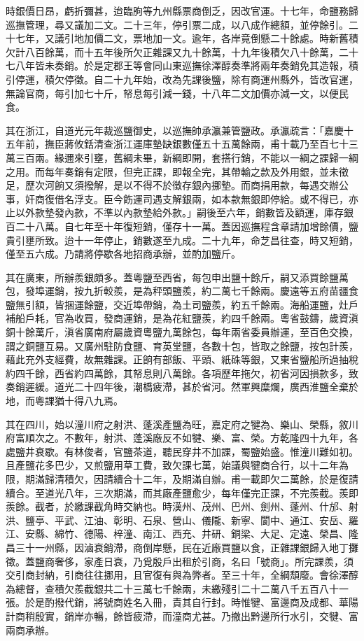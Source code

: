 \begin{pinyinscope}
時銀價日昂，虧折彌甚，迨臨朐等九州縣票商倒乏，因改官運。十七年，命鹽務歸巡撫管理，尋又議加二文。二十三年，停引票二成，以八成作總額，並停餘引。二十七年，又議引地加價二文，票地加一文。逾年，各岸竟倒懸二十餘處。時新舊積欠計八百餘萬，而十五年後所欠正雜課又九十餘萬，十九年後積欠八十餘萬，二十七八年皆未奏銷。於是定郡王等會同山東巡撫徐澤醇奏準將兩年奏銷免其造報，積引停運，積欠停徵。自二十九年始，改為先課後鹽，除有商運州縣外，皆改官運，無論官商，每引加七十斤，帑息每引減一錢，十八年二文加價亦減一文，以便民食。

其在浙江，自道光元年裁巡鹽御史，以巡撫帥承瀛兼管鹽政。承瀛疏言：「嘉慶十五年前，撫臣蔣攸銛清查浙江運庫墊缺銀數僅五十五萬餘兩，甫十載乃至百七十三萬三百兩。緣邇來引壅，舊綱未畢，新綱即開，套搭行銷，不能以一綱之課歸一綱之用。而每年奏銷有定限，但完正課，即報全完，其帶輸之款及外用銀，並未徵足，歷次河餉又須撥解，是以不得不於徵存銀內挪墊。而商捐用款，每遇交辦公事，奸商復借名浮支。臣今飭運司遇支解銀兩，如本款無銀即停給。或不得已，亦止以外款墊發內款，不準以內款墊給外款。」嗣後至六年，銷數皆及額運，庫存銀百二十八萬。自七年至十年復短銷，僅存十一萬。蓋因巡撫程含章請加增餘價，鹽貴引壅所致。迨十一年停止，銷數遂至九成。二十九年，命芝昌往查，時又短銷，僅至五六成。乃請將停歇各地招商承辦，並酌加鹽斤。

其在廣東，所辦羨銀頗多。蓋粵鹽至西省，每包申出鹽十餘斤，嗣又添買餘鹽萬包，發埠運銷，按九折較羨，是為秤頭鹽羨，約二萬七千餘兩。慶遠等五府苗疆食鹽無引額，皆捆運餘鹽，交近埠帶銷，為土司鹽羨，約五千餘兩。海船運鹽，灶戶補船戶耗，官為收買，發商運銷，是為花紅鹽羨，約四千餘兩。粵省鼓鑄，歲資滇銅十餘萬斤，滇省廣南府屬歲資粵鹽九萬餘包，每年兩省委員辦運，至百色交換，謂之銅鹽互易。又廣州駐防食鹽、育英堂鹽，各數十包，皆取之餘鹽，按包計羨，藉此充外支經費，故無雜課。正餉有部飯、平頭、紙硃等銀，又東省鹽船所過抽稅約四千餘，西省約四萬餘，其帑息則八萬餘。各項歷年拖欠，初省河因損款多，致奏銷遲緩。道光二十四年後，潮橋疲滯，甚於省河。然軍興糜爛，廣西淮鹽全棄於地，而粵課猶十得八九焉。

其在四川，始以潼川府之射洪、蓬溪產鹽為旺，嘉定府之犍為、樂山、榮縣，敘川府富順次之。不數年，射洪、蓬溪廠反不如犍、樂、富、榮。方乾隆四十九年，各處鹽井衰歇。有林俊者，官鹽茶道，聽民穿井不加課，蜀鹽始盛。惟潼川難如初。且產鹽花多巴少，又煎鹽用草工費，致欠課七萬，始議與犍商合行，以十二年為限，期滿歸清積欠，因請續合十二年，及期滿自辦。甫一載即欠二萬餘，於是復請續合。至道光八年，三次期滿，而其廠產鹽愈少，每年僅完正課，不完羨截。羨即羨餘。截者，於繳課截角時交納也。時漢州、茂州、巴州、劍州、蓬州、什邡、射洪、鹽亭、平武、江油、彰明、石泉、營山、儀隴、新寧、閬中、通江、安岳、羅江、安縣、綿竹、德陽、梓潼、南江、西充、井研、銅梁、大足、定遠、榮昌、隆昌三十一州縣，因滷衰銷滯，商倒岸懸，民在近廠買鹽以食，正雜課銀歸入地丁攤徵。蓋鹽商奢侈，家產日衰，乃覓殷戶出租於引商，名曰「號商」。所完課羨，須交引商封納，引商往往挪用，且官復有與為弊者。至三十年，全綱頹廢。會徐澤醇為總督，查積欠羨截銀共二十三萬七千餘兩，未繳殘引二十二萬八千五百八十一張。於是酌撥代銷，將號商姓名入冊，責其自行封。時惟犍、富邊商及成都、華陽計商稍殷實，銷岸亦暢，餘皆疲滯，而潼商尤甚。乃撤出黔邊所行水引，交犍、富兩商承辦。


\end{pinyinscope}
